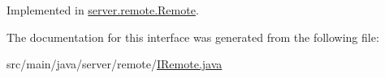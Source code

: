 Implemented in \hyperlink{classserver_1_1remote_1_1_remote_a131873c01bc4fe829dd7d2385c89ca87}{server.\+remote.\+Remote}.



The documentation for this interface was generated from the following file\+:\begin{DoxyCompactItemize}
\item 
src/main/java/server/remote/\hyperlink{_i_remote_8java}{I\+Remote.\+java}\end{DoxyCompactItemize}
